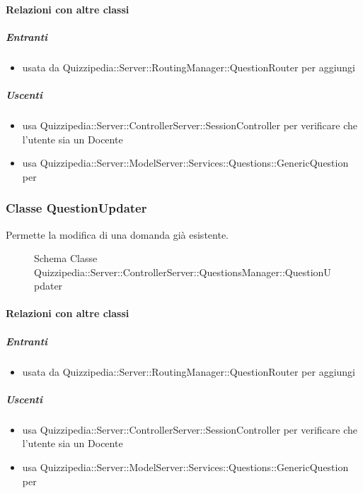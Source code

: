 \paragraph{Relazioni con altre classi}
\subparagraph{Entranti}
\begin{itemize}
\item usata da Quizzipedia::Server::RoutingManager::QuestionRouter per aggiungi
\end{itemize}
\subparagraph{Uscenti}
\begin{itemize}
\item usa Quizzipedia::Server::ControllerServer::SessionController per verificare che l'utente sia un Docente
\item usa Quizzipedia::Server::ModelServer::Services::Questions::GenericQuestion per 
\end{itemize}
\subsubsection{Classe QuestionUpdater}
Permette la modifica di una domanda già esistente.
\begin{figure}[H]
\centering
\noindent{}
\caption[Schema Classe QuestionUpdater]{Schema Classe Quizzipedia::Server::ControllerServer::QuestionsManager::QuestionUpdater}
\end{figure}
\paragraph{Relazioni con altre classi}
\subparagraph{Entranti}
\begin{itemize}
\item usata da Quizzipedia::Server::RoutingManager::QuestionRouter per aggiungi
\end{itemize}
\subparagraph{Uscenti}
\begin{itemize}
\item usa Quizzipedia::Server::ControllerServer::SessionController per verificare che l'utente sia un Docente
\item usa Quizzipedia::Server::ModelServer::Services::Questions::GenericQuestion per 
\end{itemize}
